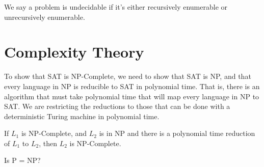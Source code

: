\documentclass[]{article}
\begin{document}
We say a problem is undecidable if it's either recursively enumerable or
unrecursively enumerable.


\section*{Complexity Theory}
To show that SAT is NP-Complete, we need to show that SAT is NP, and that every
language in NP is reducible to SAT in polynomial time. That is, there is an
algorithm that must take polynomial time that will map every language in NP to
SAT. We are restricting the reductions to those that can be done with a
deterministic Turing machine in polynomial time.

If $L_1$ is NP-Complete, and $L_2$ is in NP and there is a polynomial time
reduction of $L_1$ to $L_2$, then $L_2$ is NP-Complete.

Is P = NP?
\end{document}

